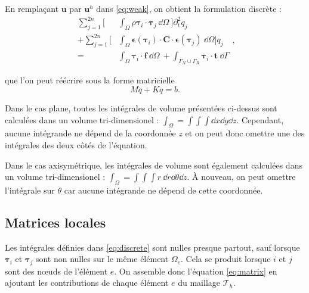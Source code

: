\documentclass[12pt]{article}
\newcommand{\uu}{\mathbf{u}}
\newcommand{\strain}{\boldsymbol{\epsilon}}
\newcommand{\shapef}{\boldsymbol{\tau}}
\begin{document}
En remplaçant $\uu$ par $\uu^h$ dans \eqref{eq:weak}, on obtient la
formulation discrète :
\begin{equation}
    \begin{aligned}
        \sum_{j=1}^{2n} \bigg[&\int_\Omega \rho \shapef_i \cdot \shapef_j \: \dd \Omega \: \bigg]
        \partial^2_t q_j\\
        + \sum_{j=1}^{2n} \bigg[&\int_\Omega \strain(\shapef_i) \cdot \mathbf{C} \cdot \strain(\shapef_j)\: \dd \Omega\bigg] q_j\\
        = &\int_\Omega \shapef_i \cdot \mathbf{f} \: \dd \Omega \: + \int_{\Gamma_N \cup \Gamma_R} \shapef_i \cdot
        \mathbf{t} \: \dd \Gamma
    \end{aligned},
    \label{eq:discrete}
\end{equation}

que l'on peut réécrire sous la forme matricielle
\begin{equation}
    M \ddot{q} + K q = b. \label{eq:matrix}
\end{equation}

Dans le cas plane, toutes les intégrales de volume présentées ci-dessus sont 
calculées dans un volume tri-dimensionel : 
$\int_{\Omega} = \int \int \int \dd x \dd y \dd z$.
Cependant, aucune intégrande ne dépend de la coordonnée $z$ et on peut donc
omettre une des intégrales des deux côtés de l'équation.

Dans le cas axisymétrique, les intégrales de volume sont également calculées 
dans un volume tri-dimensionel :
$\int_{\Omega} = \int \int \int r \: \dd r \dd \theta \dd z$.
À nouveau, on peut omettre l'intégrale sur $\theta$ car aucune intégrande ne
dépend de cette coordonnée.

\subsection{Matrices locales}

Les intégrales définies dans \eqref{eq:discrete} sont nulles presque partout, 
sauf lorsque $\shapef_i$ et $\shapef_j$ sont non nulles sur le même élément
$\Omega_e$. Cela se produit lorsque $i$ et $j$ sont des n\oe uds de l'élément
$e$. On assemble donc l'équation \eqref{eq:matrix} en ajoutant les contributions
de chaque élément $e$ du maillage $\mathcal{T}_h$.
\end{document}
